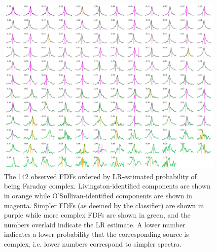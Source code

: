   \begin{figure}
    \centering
    \includegraphics[width=\linewidth]{faraday-images/both_spectra_lr.pdf}
    \caption[The 142 observed FDFs ordered by LR-estimated probability of being Faraday complex.]{The 142 observed FDFs ordered by LR-estimated probability of being Faraday complex. Livingston-identified components are shown in orange while O'Sullivan-identified components are shown in magenta. Simpler FDFs (as deemed by the classifier) are shown in purple while more complex FDFs are shown in green, and the numbers overlaid indicate the LR estimate. A lower number indicates a lower probability that the corresponding source is complex, i.e. lower numbers correspond to simpler spectra.}
    \label{fig:faraday-all-observed-fdfs-lr}
  \end{figure}


